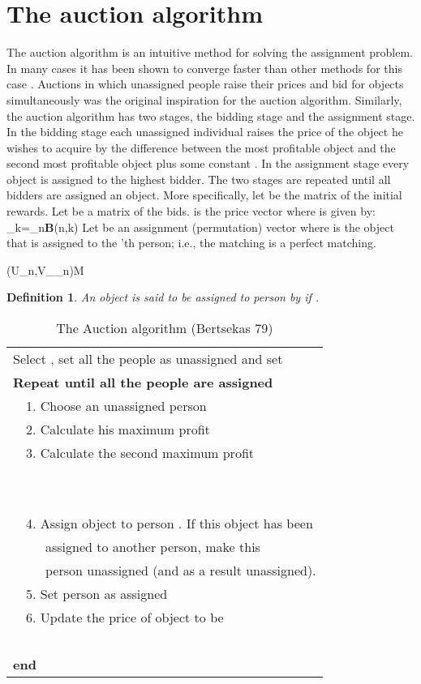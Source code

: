 \documentclass[11pt,onecolumn]{article}
\newcounter{theorem}
\newcounter{definition}
\newtheorem{definition}{Definition}
\newcommand{\beq}{}
\begin{document}
\section{The auction algorithm}
\label{section_auction_alg}
The auction algorithm \cite{bertsekas1979distributed} is an intuitive method for solving the assignment problem. In many cases it has been shown to converge faster than other methods for this case \cite{bertsekas1990auction}. Auctions in which unassigned people raise their prices and bid for objects simultaneously was the original inspiration for the auction algorithm. Similarly, the auction algorithm has two stages, the bidding stage and the assignment stage. In the bidding stage each unassigned individual raises the price of the object he wishes to acquire by the difference between the most profitable object and the second most profitable object plus some constant . In the assignment stage every object is assigned to the highest bidder. The two stages are repeated until all bidders are assigned an object. More specifically, let  be the matrix of the initial rewards. Let  be a matrix of the bids.  is the price vector where  is given by:
\beq\label{eq_rho}
\rho_k=\max_{n}\textbf{B}(n,k)
\eeq
Let  be an assignment (permutation) vector  where  is the object that is assigned to the 'th person; i.e., the matching  is a perfect matching.
\beq
(U_n,V_{\eta_n})\in M
\eeq
\begin{definition} An object  is said to be \emph{assigned} to person  by  if .
\end{definition}
\begin{table}
\caption{The Auction algorithm (Bertsekas 79)}
\label{table_auction_alg}
\begin{tabular}{l}
\hline
Select , set all the people as unassigned and set \\
\textbf{Repeat until all the people are assigned}\\
\ \ 1. Choose an unassigned person \\
\ \ 2. Calculate his maximum profit  \\
\ \ 3. Calculate the second maximum profit\\
\ \ \ \ \ \\
\ \ \ \ \ \\
\ \ 4. Assign object  to person . If this object has been\\
\ \ \ \ \ assigned to another person, make this \\
\ \ \ \ \ person unassigned (and as a result unassigned).\\
\ \ 5. Set person  as assigned\\
\ \ 6. Update the price of object  to be \\
\ \ \ \ \ \\
\textbf{end} \\
\hline
\end{tabular}
\end{table}
\end{document}
